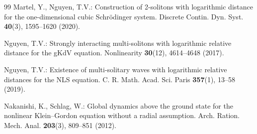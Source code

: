 \documentclass[reqno]{amsart}
\theoremstyle{plain}
\theoremstyle{definition}
\numberwithin{equation}{section}
\begin{document}
\begin{thebibliography}{99}
 Martel, Y., Nguyen, T.V.:
Construction of 2-solitons with logarithmic distance for the one-dimensional cubic Schr\"odinger system.
Discrete Contin. Dyn. Syst. \textbf{40}(3), 1595--1620 (2020).


 Nguyen, T.V.:
Strongly interacting multi-solitons with logarithmic relative distance for the gKdV equation.
Nonlinearity \textbf{30}(12), 4614--4648 (2017).

 Nguyen, T.V.:
Existence of multi-solitary waves with logarithmic relative distances for the NLS equation.
C. R. Math. Acad. Sci. Paris \textbf{357}(1), 13--58 (2019).


 Nakanishi, K., Schlag, W.:
Global dynamics above the ground state for the nonlinear Klein--Gordon equation without a radial assumption.
Arch. Ration. Mech. Anal. \textbf{203}(3), 809--851 (2012).

%
%






\end{thebibliography}
\end{document}
